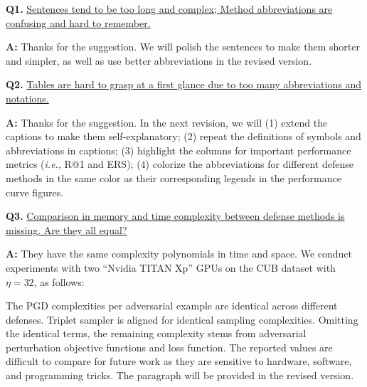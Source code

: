 \documentclass[10pt,twocolumn,letterpaper]{article}
\begin{document}
\noindent\textbf{Q1.}
%
\ul{
Sentences tend to be too long and complex; Method abbreviations are confusing
and hard to remember.
}

\noindent\textbf{A:} Thanks for the suggestion. We will polish the sentences to make
them shorter and simpler, as well as use better abbreviations in the 
revised version.

\noindent\textbf{Q2.}
%
\ul{
Tables are hard to grasp at a first glance due to too many abbreviations and
notations.
}

\noindent\textbf{A:} Thanks for the suggestion.
In the next revision, we will (1) extend the captions to make them
self-explanatory; (2) repeat the definitions of symbols and abbreviations in
captions; (3) highlight the columns for important performance metrics
(\emph{i.e.}, R@1 and ERS); (4) colorize the abbreviations for different
defense methods in the same color as their corresponding legends in the
performance curve figures. 

\noindent\textbf{Q3.}
%
\ul{
Comparison in memory and time complexity between defense methods is missing. Are they all
equal?
}

\noindent\textbf{A:}
%
They have the same complexity polynomials in time and space.
%
We conduct experiments with two ``Nvidia TITAN Xp'' GPUs on the CUB dataset
with $\eta{=}32$, as follows:

\noindent%
%
The PGD complexities per adversarial
example are identical across different defenses.
%
Triplet sampler is aligned for identical sampling complexities.
%
Omitting the identical terms, the remaining complexity stems from adversarial perturbation objective functions and loss function.
%
The reported values are difficult to compare for future work as they are sensitive
to hardware, software, and programming tricks.
%
The paragraph will be provided in the revised version.
\end{document}
